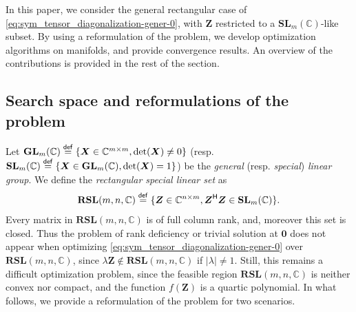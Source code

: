 \documentclass[final,onefignum,onetabnum]{siamart190516}
\newcommand{\matr}[1]{\boldsymbol{#1}}
\renewcommand{\H}{{\sf H}} %
\newcommand{\eqdef}{\stackrel{\sf def}{=}}
\newcommand{\CC}{\mathbb{C}}
\renewcommand{\H}{{\sf H}}      %
\newcommand{\GL}{\mathbf{GL}}
\newcommand{\SL}{\mathbf{SL}}
\begin{document}
In this paper, we consider the general rectangular case of  \cref{eq:sym_tensor_diagonalization-gener-0}, with $\matr{Z}$ restricted to a $\SL_{m}(\CC)$-like subset. 
By using a reformulation of the problem, we develop optimization algorithms on manifolds, and provide convergence results.
An overview of the contributions is provided in the rest of the section. 


\subsection{Search space and reformulations of the problem}
Let $\GL_{m}(\CC)\eqdef\{\matr{X}\in\CC^{m\times m}, {\rm det}(\matr{X})\neq 0\}$ (resp.  $\SL_{m}(\CC)\eqdef\{\matr{X}\in\GL_{m}(\CC), {\rm det}(\matr{X})=1\}$) be the \emph{general} (resp. \emph{special}) \emph{linear
group}. 
We define the \emph{rectangular special linear set} as
\begin{align}\label{eq:def_rsl}
\textbf{RSL}(m,n,\CC) \eqdef \{\matr{Z}\in\CC^{n\times m}, \matr{Z}^{\H}\matr{Z}\in\SL_{m}(\CC)\}.
\end{align}
Every matrix in $\textbf{RSL}(m,n,\CC)$ is of full column rank, and, moreover this set is closed. 
Thus the problem of rank deficiency or trivial solution at $\matr{0}$ does not appear when optimizing \cref{eq:sym_tensor_diagonalization-gener-0} over $\textbf{RSL}(m,n,\CC)$, since $\lambda\matr{Z}\notin\textbf{RSL}(m,n,\CC)$ if $|\lambda|\neq1$.
Still, this remains a difficult optimization problem, since the feasible region $\textbf{RSL}(m,n,\CC)$ is neither convex nor compact, and the function $f(\matr{Z})$ is a  quartic polynomial. 
In what follows, we provide a reformulation of the problem for two scenarios.
\end{document}
